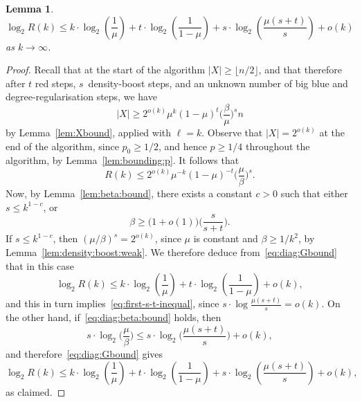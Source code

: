 \documentclass[12pt,reqno]{amsart}
\newtheorem{lemma}[theorem]{Lemma}
\theoremstyle{definition}
\theoremstyle{remark}
\renewcommand{\le}{\leqslant}
\renewcommand{\ge}{\geqslant}
\renewcommand{\to}{\rightarrow}
\begin{document}
\begin{lemma}\label{lem:diag:inequality1}
\begin{equation}\label{eq:first-s-t-inequal}
\log_2 R(k) \le k \cdot \log_2 \left( \frac{1}{\mu} \right) + t \cdot \log_2 \left(\frac{1}{1-\mu} \right) + s \cdot \log_2 \left(\frac{\mu(s+t)}{s}\right) + o(k)
\end{equation}
as $k \to \infty$. 
\end{lemma}

\begin{proof}
Recall that at the start of the algorithm $|X| \ge \lfloor n/2 \rfloor$, and that therefore after $t$ red steps, $s$~density-boost steps, and an unknown number of big blue and degree-regularisation steps, we have 
\begin{equation}\label{eq:diag:Xbound}
|X| \ge 2^{o(k)} \mu^k (1 - \mu)^t \bigg( \frac{\beta}{\mu} \bigg)^s n
\end{equation}
by Lemma~\ref{lem:Xbound}, applied with $\ell = k$. Observe that $|X| = 2^{o(k)}$ at the end of the algorithm, since $p_0 \ge 1/2$, and hence $p \ge 1/4$ throughout the algorithm, by Lemma~\ref{lem:bounding:p}. It follows that
\begin{equation}\label{eq:diag:Gbound}
R(k) \le 2^{o(k)} \mu^{-k} (1 - \mu)^{-t} \bigg( \frac{\mu}{\beta} \bigg)^s.
\end{equation}
Now, by Lemma~\ref{lem:beta:bound}, there exists a constant $c > 0$ such that either $s \le k^{1-c}$, or
\begin{equation}\label{eq:diag:beta:bound}
\beta \ge \big(1 + o(1) \big) \bigg( \frac{s}{s + t} \bigg). 
\end{equation}
If $s \le k^{1-c}$, then $( \mu / \beta )^s = 2^{o(k)}$, since $\mu$ is constant and $\beta \ge 1/k^2$, by Lemma~\ref{lem:density:boost:weak}. We therefore deduce from~\eqref{eq:diag:Gbound} that in this case
$$\log_2 R(k) \le k \cdot \log_2 \left( \frac{1}{\mu} \right) + t \cdot \log_2 \left(\frac{1}{1-\mu} \right) + o(k),$$ 
and this in turn implies~\eqref{eq:first-s-t-inequal}, since $s \cdot \log \frac{\mu(s+t)}{s} = o(k)$. On the other hand, if~\eqref{eq:diag:beta:bound} holds, then
$$s \cdot \log_2 \bigg( \frac{\mu}{\beta} \bigg) \le s \cdot \log_2 \bigg( \frac{\mu(s+t)}{s} \bigg) + o(k),$$
and therefore~\eqref{eq:diag:Gbound} gives 
$$\log_2 R(k) \le k \cdot \log_2 \left( \frac{1}{\mu} \right) + t \cdot \log_2 \left(\frac{1}{1-\mu} \right) + s \cdot \log_2 \left(\frac{\mu(s+t)}{s}\right) + o(k),$$
as claimed. 
\end{proof}
\end{document}
